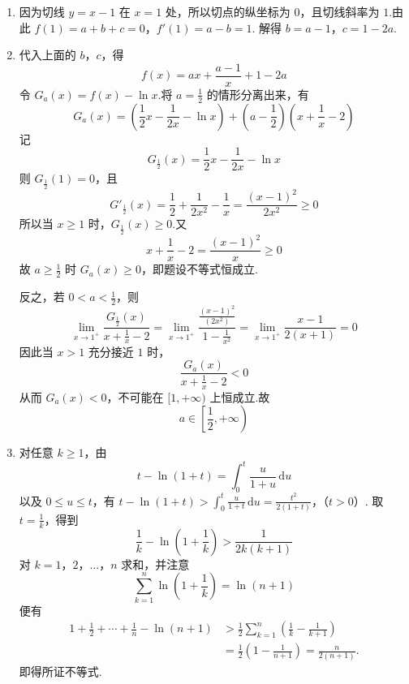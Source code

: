 \begin{solution}
\begin{enumerate}
\item 因为切线 \(y=x-1\) 在 \(x=1\) 处，所以切点的纵坐标为 \(0\)，且切线斜率为 \(1\).由此
\(f(1)=a+b+c=0\)，\(f'(1)=a-b=1\).
解得
\(b=a-1\)，\(c=1-2a\).

\item 代入上面的 \(b\)，\(c\)，得
\[
f(x)=ax+\frac{a-1}{x}+1-2a
\]
令 \(G_a(x)=f(x)-\ln x\).将 \(a=\frac12\) 的情形分离出来，有
\[
G_a(x)=\left(\frac12x-\frac1{2x}-\ln x\right)
+\left(a-\frac12\right)\left(x+\frac1x-2\right)
\]
记
\[
G_{\frac{1}{2}}(x)=\frac12x-\frac1{2x}-\ln x
\]
则 \(G_{\frac{1}{2}}(1)=0\)，且
\[
G'_{\frac{1}{2}}(x)
=\frac12+\frac1{2x^2}-\frac1x
=\frac{(x-1)^2}{2x^2}\geqslant0
\]
所以当 \(x\geqslant1\) 时，\(G_{\frac{1}{2}}(x)\geqslant0\).又
\[
x+\frac1x-2=\frac{(x-1)^2}{x}\geqslant0
\]
故 \(a\geqslant\frac12\) 时 \(G_a(x)\geqslant0\)，即题设不等式恒成立.

反之，若 \(0<a<\frac12\)，则
\[
\lim_{x\to1^+}
\frac{G_{\frac{1}{2}}(x)}{x+\frac1x-2}
=\lim_{x\to1^+}
\frac{\frac{(x-1)^2}{(2x^2)}}{1-\frac{1}{x^2}}
=\lim_{x\to1^+}\frac{x-1}{2(x+1)}
=0
\]
因此当 \(x>1\) 充分接近 \(1\) 时，
\[
\frac{G_a(x)}{x+\frac{1}{x}-2}<0
\]
从而 \(G_a(x)<0\)，不可能在 \([1,+\infty)\) 上恒成立.故
\[
a\in\left[\frac12,+\infty\right)
\]

\item 对任意 \(k\geqslant1\)，由
\[
t-\ln(1+t)=\int_0^t\frac{u}{1+u}\,\mathrm du
\]
以及 \(0\leqslant u\leqslant t\)，有
\(t-\ln(1+t)> \int_0^t\frac{u}{1+t}\,\mathrm du =\frac{t^2}{2(1+t)}\)，（\(t>0\)）.
取 \(t=\frac1k\)，得到
\[
\frac1k-\ln\left(1+\frac1k\right)
>\frac1{2k(k+1)}
\]
对 \(k=1\)，\(2\)，\(\ldots\)，\(n\) 求和，并注意
\[
\sum_{k=1}^n\ln\left(1+\frac1k\right)
=\ln(n+1)
\]
便有
\[
\begin{aligned}
1+\frac12+\cdots+\frac1n-\ln(n+1)
&>\frac12\sum_{k=1}^n\left(\frac1k-\frac1{k+1}\right)\\
&=\frac12\left(1-\frac1{n+1}\right)
=\frac{n}{2(n+1)}.
\end{aligned}
\]
即得所证不等式.
\end{enumerate}
\end{solution}

